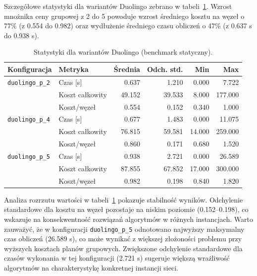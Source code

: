 Szczegółowe statystyki dla wariantów Duolingo zebrano w tabeli~\ref{tab:ext-duolingo-stats}. Wzrost mnożnika ceny grupowej z 2 do 5 powoduje wzrost średniego kosztu na węzeł o 77\% (z 0.554 do 0.982) oraz wydłużenie średniego czasu obliczeń o 47\% (z 0.637 s do 0.938 s).

\begin{table}[H]
    \centering
    \caption{Statystyki dla wariantów Duolingo (benchmark statyczny).}
    \label{tab:ext-duolingo-stats}
    \begin{tabular}{llrrrr}
        \toprule
        \textbf{Konfiguracja}   & \textbf{Metryka} & \textbf{Średnia} & \textbf{Odch. std.} & \textbf{Min} & \textbf{Max} \\
        \midrule
        \texttt{duolingo\_p\_2} & Czas [s]         & 0.637            & 1.210               & 0.000        & 7.722        \\
                                & Koszt całkowity  & 49.152           & 39.533              & 8.000        & 177.000      \\
                                & Koszt/węzeł      & 0.554            & 0.152               & 0.340        & 1.000        \\
        \midrule
        \texttt{duolingo\_p\_4} & Czas [s]         & 0.677            & 1.483               & 0.000        & 11.075       \\
                                & Koszt całkowity  & 76.815           & 59.581              & 14.000       & 259.000      \\
                                & Koszt/węzeł      & 0.860            & 0.171               & 0.680        & 1.520        \\
        \midrule
        \texttt{duolingo\_p\_5} & Czas [s]         & 0.938            & 2.721               & 0.000        & 26.589       \\
                                & Koszt całkowity  & 87.855           & 67.852              & 17.000       & 300.000      \\
                                & Koszt/węzeł      & 0.982            & 0.198               & 0.840        & 1.820        \\
        \bottomrule
    \end{tabular}
\end{table}



Analiza rozrzutu wartości w tabeli~\ref{tab:ext-duolingo-stats} pokazuje stabilność wyników. Odchylenie standardowe dla kosztu na węzeł pozostaje na niskim poziomie (0.152--0.198), co wskazuje na konsekwentność rozwiązań algorytmów w różnych instancjach. Warto zauważyć, że w konfiguracji \texttt{duolingo\_p\_5} odnotowano najwyższy maksymalny czas obliczeń (26.589 s), co może wynikać z większej złożoności problemu przy wyższych kosztach planów grupowych. Zwiększone odchylenie standardowe dla czasów wykonania w tej konfiguracji (2.721 s) sugeruje większą wrażliwość algorytmów na charakterystykę konkretnej instancji sieci.

